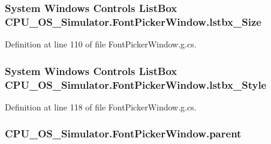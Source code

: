 \subsubsection[{lstbx\+\_\+\+Size}]{\setlength{\rightskip}{0pt plus 5cm}System Windows Controls List\+Box C\+P\+U\+\_\+\+O\+S\+\_\+\+Simulator.\+Font\+Picker\+Window.\+lstbx\+\_\+\+Size\hspace{0.3cm}{\ttfamily [package]}}\label{class_c_p_u___o_s___simulator_1_1_font_picker_window_a8d7855c50915b0975ee314de961c00d5}


Definition at line 110 of file Font\+Picker\+Window.\+g.\+cs.

\hypertarget{class_c_p_u___o_s___simulator_1_1_font_picker_window_adf923069128ca0ca766c810601319286}{}
\subsubsection[{lstbx\+\_\+\+Style}]{\setlength{\rightskip}{0pt plus 5cm}System Windows Controls List\+Box C\+P\+U\+\_\+\+O\+S\+\_\+\+Simulator.\+Font\+Picker\+Window.\+lstbx\+\_\+\+Style\hspace{0.3cm}{\ttfamily [package]}}\label{class_c_p_u___o_s___simulator_1_1_font_picker_window_adf923069128ca0ca766c810601319286}


Definition at line 118 of file Font\+Picker\+Window.\+g.\+cs.

\hypertarget{class_c_p_u___o_s___simulator_1_1_font_picker_window_a4e59cc593e060f3229adc8decfeb151c}{}
\subsubsection[{parent}]{ C\+P\+U\+\_\+\+O\+S\+\_\+\+Simulator.\+Font\+Picker\+Window.\+parent\hspace{0.3cm}{\ttfamily [private]}}\label{class_c_p_u___o_s___simulator_1_1_font_picker_window_a4e59cc593e060f3229adc8decfeb151c}


